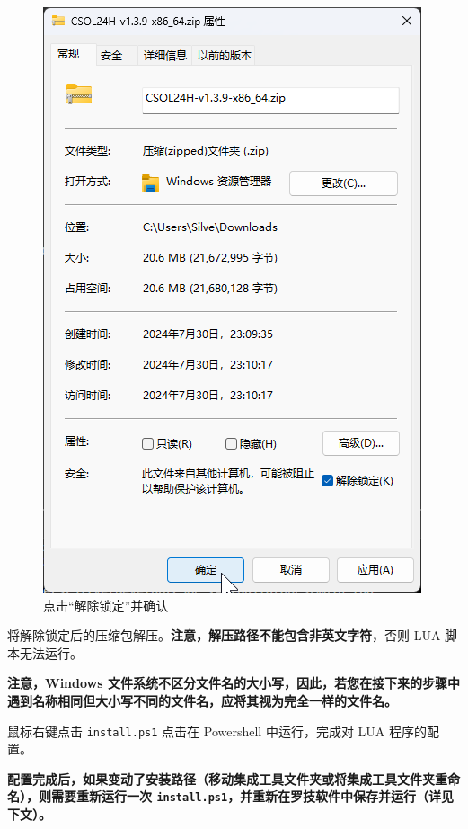 \begin{figure}[H]
    \Centering
    \includegraphics[width=\textwidth]{docs/assets/unlock_01.png}
    \caption{点击“解除锁定”并确认}
\end{figure}

将解除锁定后的压缩包解压。\textbf{\color{red}注意，解压路径不能包含非英文字符}，否则 LUA 脚本无法运行。

\textbf{\color{red}注意，Windows 文件系统不区分文件名的大小写，因此，若您在接下来的步骤中遇到名称相同但大小写不同的文件名，应将其视为完全一样的文件名。}

鼠标右键点击 \lstinline{install.ps1} 点击在 Powershell 中运行，完成对 LUA 程序的配置。

\textbf{\color{red}配置完成后，如果变动了安装路径（移动集成工具文件夹或将集成工具文件夹重命名），则需要重新运行一次 \lstinline{install.ps1}，并重新在罗技软件中保存并运行（详见下文）。}

